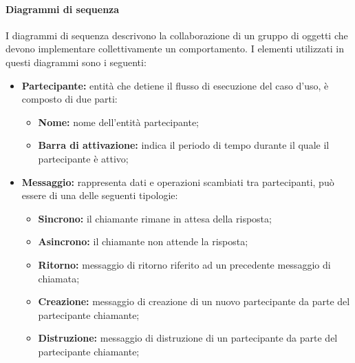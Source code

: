 \paragraph*{Diagrammi di sequenza}
I diagrammi di sequenza descrivono la collaborazione di un gruppo di oggetti che devono implementare collettivamente un comportamento.
I elementi utilizzati in questi diagrammi sono i seguenti:
\begin{itemize}
	\item \textbf{Partecipante:} entità che detiene il flusso di esecuzione del caso d'uso, è composto di due parti:
	\begin{itemize}
		\item \textbf{Nome:} nome dell'entità partecipante;
		\item \textbf{Barra di attivazione:} indica il periodo di tempo durante il quale il partecipante è attivo;
	\end{itemize}
	\item \textbf{Messaggio:} rappresenta dati e operazioni scambiati tra partecipanti, può essere di una delle seguenti tipologie:
	\begin{itemize}
		\item \textbf{Sincrono:} il chiamante rimane in attesa della risposta;
		\item \textbf{Asincrono:} il chiamante non attende la risposta; 
		\item \textbf{Ritorno:} messaggio di ritorno riferito ad un precedente messaggio di chiamata;
		\item \textbf{Creazione:} messaggio di creazione di un nuovo partecipante da parte del partecipante chiamante;
		\item \textbf{Distruzione:} messaggio di distruzione di un partecipante da parte del partecipante chiamante;
	\end{itemize}
\end{itemize}

